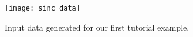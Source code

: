 \documentclass{article}
\begin{document}
\begin{figure}
\texttt{[image: sinc\_data]}
\caption{Input data generated for our first tutorial example.}
\label{figure:sinc_regression}
\end{figure}


% 
% 
% 
% 
% 
% 
% 
% 
% 
% 
% 
% 
% 
\end{document}
